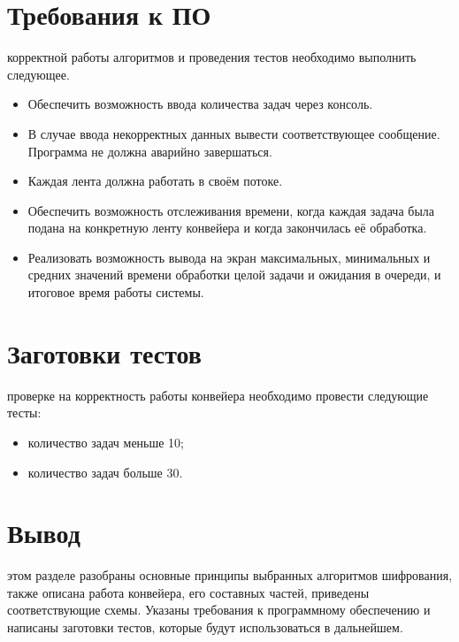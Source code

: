 \section{Требования к ПО}
 корректной работы алгоритмов и проведения тестов необходимо выполнить следующее.
\begin{itemize}
	\item Обеспечить возможность ввода количества задач через консоль.
	\item В случае ввода некорректных данных вывести соответствующее сообщение. Программа не должна аварийно завершаться.
	\item Каждая лента должна работать в своём потоке.
	\item Обеспечить возможность отслеживания времени, когда каждая задача была подана на конкретную ленту конвейера и когда закончилась её обработка.
	\item Реализовать возможность вывода на экран максимальных, минимальных и средних значений времени обработки целой задачи и ожидания в очереди, и итоговое время работы системы.
\end{itemize}

\section{Заготовки тестов}
 проверке на корректность работы конвейера необходимо провести следующие тесты:
\begin{itemize}
	\item количество задач меньше 10;
	\item количество задач больше 30.
\end{itemize}

\section*{Вывод}
 этом разделе разобраны основные принципы выбранных алгоритмов шифрования, также описана работа конвейера, его составных частей, приведены соответствующие схемы. Указаны требования к программному обеспечению и написаны заготовки тестов, которые будут использоваться в дальнейшем.

